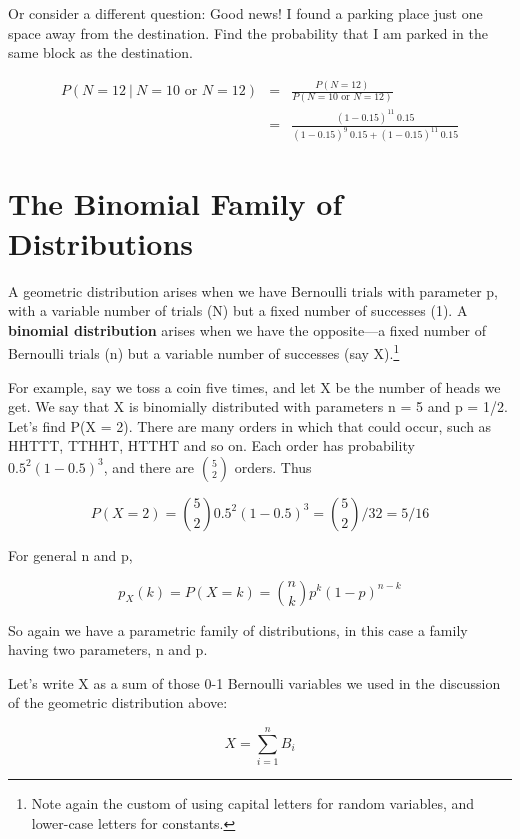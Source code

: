 Or consider a different question: Good news!  I found a parking place
just one space away from the destination.  Find the probability that I
am parked in the same block as the destination.

\begin{eqnarray}
P(N = 12 ~|~ N = 10 \textrm{ or } N = 12) &=&
\frac{P(N = 12)}{P(N = 10 \textrm{ or } N = 12)} \\
&=& \frac
{(1-0.15)^{11} ~ 0.15}
{(1-0.15)^{9} ~ 0.15 + (1-0.15)^{11} ~ 0.15}
\end{eqnarray}

\section{The Binomial Family of Distributions}
\label{binom}

A geometric distribution arises when we have Bernoulli trials with
parameter p, with a variable number of trials (N) but a fixed number of
successes (1).  A {\bf binomial distribution} arises when we have the
opposite---a fixed number of Bernoulli trials (n) but a variable number
of successes (say X).\footnote{Note again the custom of using capital
letters for random variables, and lower-case letters for constants.}

For example, say we toss a coin five times, and let X be the number of
heads we get.  We say that X is binomially distributed with parameters n
= 5 and p = 1/2.  Let's find P(X = 2).  There are many orders in which
that could occur, such as HHTTT, TTHHT, HTTHT and so on.  Each order has
probability $0.5^2(1-0.5)^3$, and there are $\binom{5}{2}$ orders.  Thus

\begin{equation}
P(X = 2) = \binom{5}{2} 0.5^2(1-0.5)^3 = \binom{5}{2} / 32 = 5/16 
\end{equation}

For general n and p,

\begin{equation}
\label{binompmf}
p_X(k) = P(X = k) = \binom{n}{k} p^k (1-p)^{n-k}  
\end{equation}

So again we have a parametric family of distributions, in this case a
family having two parameters, n and p.

Let's write X as a sum of those 0-1 Bernoulli variables we used in the
discussion of the geometric distribution above:

\begin{equation}
\label{sumbern}
X = \sum_{i=1}^{n} B_i
\end{equation}

